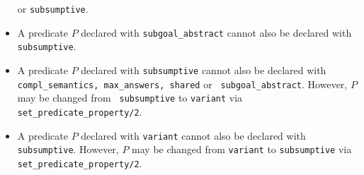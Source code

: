 \begin{itemize}
  or {\tt subsumptive}.
%
\item A predicate $P$ declared with {\tt subgoal\_abstract} cannot also
  be declared with {\tt subsumptive}.
%
\item A predicate $P$ declared with {\tt subsumptive} cannot also be
  declared with {\tt compl\_semantics, max\_answers, shared} or {\tt
    subgoal\_abstract}.  However, $P$ may be changed from {\tt
    subsumptive} to {\tt variant} via {\tt
    set\_predicate\_property/2}.
%
\item A predicate $P$ declared with {\tt variant} cannot also be
  declared with {\tt subsumptive}. However, $P$ may be changed from
  {\tt variant} to {\tt subsumptive} via {\tt
    set\_predicate\_property/2}.

\end{itemize}

